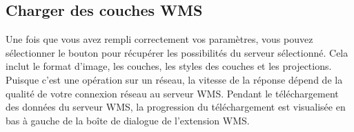 

\subsection{Charger des couches WMS}\label{sec:ogc-wms-layers}

Une fois que vous avez rempli correctement vos paramètres, vous pouvez sélectionner le bouton  pour récupérer les possibilités du serveur sélectionné. Cela inclut le format d'image, les couches, les styles des couches et les projections. Puisque c'est une opération sur un réseau, la vitesse de la réponse dépend de la qualité de votre connexion réseau au serveur WMS. Pendant le téléchargement des données du serveur WMS, la progression du téléchargement est visualisée en bas à gauche de la boîte de dialogue de l'extension WMS.

